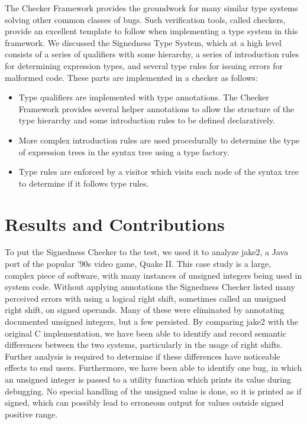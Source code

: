 \documentclass{sig-alternate-05-2015}
\begin{document}
The Checker Framework provides the groundwork for many similar type systems solving other common classes of bugs. Such verification tools, called checkers, provide an excellent template to follow when implementing a type system in this framework. We discussed the Signedness Type System, which at a high level consists of a series of qualifiers with some hierarchy, a series of introduction rules for determining expression types, and several type rules for issuing errors for malformed code. These parts are implemented in a checker as follows:

\begin{itemize}
  \item Type qualifiers are implemented with type annotations. The Checker Framework provides several helper annotations to allow the structure of the type hierarchy and some introduction rules to be defined declaratively.
  \item More complex introduction rules are used procedurally to determine the type of expression trees in the syntax tree using a type factory.
  \item Type rules are enforced by a visitor which visits each node of the syntax tree to determine if it follows type rules.
\end{itemize}


\section{Results and Contributions}

To put the Signedness Checker to the test, we used it to analyze jake2, a Java port of the popular '90s video game, Quake II. This case study is a large, complex piece of software, with many instances of unsigned integers being used in system code. Without applying annotations the Signedness Checker listed many perceived errors with using a logical right shift, sometimes called an unsigned right shift, on signed operands. Many of these were eliminated by annotating documented unsigned integers, but a few persisted. By comparing jake2 with the original C implementation, we have been able to identify and record semantic differences between the two systems, particularly in the usage of right shifts. Further analysis is required to determine if these differences have noticeable effects to end users. Furthermore, we have been able to identify one bug, in which an unsigned integer is passed to a utility function which prints its value during debugging. No special handling of the unsigned value is done, so it is printed as if signed, which can possibly lead to erroneous output for values outside signed positive range.




\end{document}
